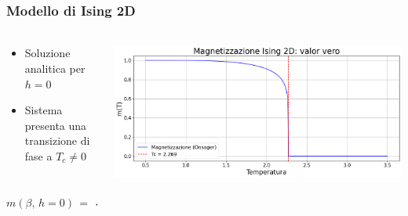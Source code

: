 \begin{frame}
    \frametitle{Modello di Ising 2D}
    \framesubtitle{}

    \begin{columns}

        \begin{column}{0.55\textwidth}

			\begin{itemize}[itemsep=0.5em, label=$\diamond$]
                \item Soluzione analitica per $h = 0$
                \item Sistema presenta una transizione di fase a $T_c \neq 0$
            \end{itemize}

			\begin{equation*}
				m\left(\beta,\,h=0\right)\,=\,
				\begin{cases}
				\left[1\,-\,\dfrac{1}{\sinh^4{\left(2\beta J\right)}}\right]^{\frac{1}{8}}\,\, T\,<\,T_c \\
				0 \qquad \qquad \qquad \qquad \,\,\,\, T\,>\,T_c
				\end{cases}
				\label{eq: magn_Ising2D_AS}
			\end{equation*}

        \end{column}
        
        \vspace{0.3cm}

        \begin{column}{0.45\textwidth}
			
			\centering
            \includegraphics[width=\textwidth]{Immagini/Introduzione/magn_Ising2D.png}


\end{column}
\end{columns}
\end{frame}
